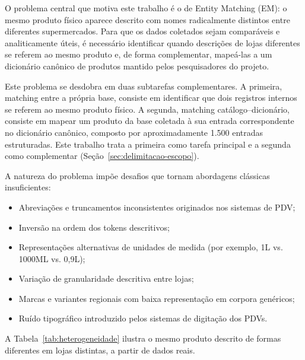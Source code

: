 \documentclass[
    article,
    12pt,
    oneside,
    a4paper,
    english,
    brazilian
    ]{abntex2}
\numberwithin{equation}{section}
\begin{document}
O problema central que motiva este trabalho é o de Entity Matching (EM): o mesmo produto físico aparece descrito com nomes radicalmente distintos entre diferentes supermercados. Para que os dados coletados sejam comparáveis e analiticamente úteis, é necessário identificar quando descrições de lojas diferentes se referem ao mesmo produto e, de forma complementar, mapeá-las a um dicionário canônico de produtos mantido pelos pesquisadores do projeto.

Este problema se desdobra em duas subtarefas complementares. A primeira, matching entre a própria base, consiste em identificar que dois registros internos se referem ao mesmo produto físico. A segunda, matching catálogo--dicionário, consiste em mapear um produto da base coletada à sua entrada correspondente no dicionário canônico, composto por aproximadamente 1.500 entradas estruturadas. Este trabalho trata a primeira como tarefa principal e a segunda como complementar (Seção~\ref{sec:delimitacao-escopo}).

A natureza do problema impõe desafios que tornam abordagens clássicas insuficientes:

\begin{itemize}
    \item Abreviações e truncamentos inconsistentes originados nos sistemas de PDV;
    \item Inversão na ordem dos tokens descritivos;
    \item Representações alternativas de unidades de medida (por exemplo, 1L vs. 1000ML vs. 0,9L);
    \item Variação de granularidade descritiva entre lojas;
    \item Marcas e variantes regionais com baixa representação em corpora genéricos;
    \item Ruído tipográfico introduzido pelos sistemas de digitação dos PDVs.
\end{itemize}

A Tabela~\ref{tab:heterogeneidade} ilustra o mesmo produto descrito de formas diferentes em lojas distintas, a partir de dados reais.


\end{document}
